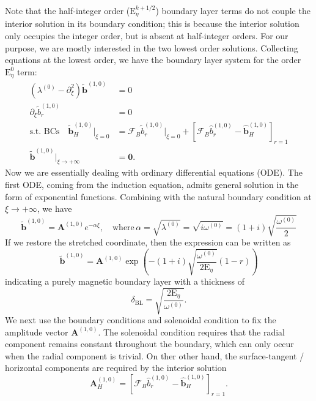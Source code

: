 %
Note that the half-integer order ($\mathrm{E}_\eta^{k+1/2}$) boundary layer terms do not couple the interior solution in its boundary condition; this is because the interior solution only occupies the integer order, but is absent at half-integer orders. For our purpose, we are mostly interested in the two lowest order solutions. Collecting equations at the lowest order, we have the boundary layer system for the order $\mathrm{E}_\eta^{0}$ term:
%
\begin{equation}
\begin{aligned}
    \left(\lambda^{(0)} - \partial_\xi^2 \right) \widetilde{\mathbf{b}}^{(1,0)} &= 0 \\ 
    \partial_\xi \widetilde{b}_r^{(1,0)} &= 0 \\ 
    \text{s.t. BCs} \quad \widetilde{\mathbf{b}}_H^{(1,0)}|_{\xi=0} &= \mathcal{F}_B \widetilde{b}_r^{(1,0)}|_{\xi=0} + \left[\mathcal{F}_B \widehat{b}_r^{(1,0)} - \widehat{\mathbf{b}}_H^{(1,0)}\right]_{r=1} \\ 
    \widetilde{\mathbf{b}}^{(1,0)}|_{\xi\rightarrow +\infty} &= \mathbf{0}.
\end{aligned}
\end{equation}
%
Now we are essentially dealing with ordinary differential equations (ODE). The first ODE, coming from the induction equation, admits general solution in the form of exponential functions. Combining with the natural boundary condition at $\xi\rightarrow +\infty$, we have
%
\begin{equation}
    \widetilde{\mathbf{b}}^{(1,0)} = \mathbf{A}^{(1,0)} e^{-\alpha\xi},\quad \text{where} \, \alpha = \sqrt{\lambda^{(0)}} = \sqrt{i\omega^{(0)}} = (1 + i) \sqrt{\frac{\omega^{(0)}}{2}}
\end{equation}
%
If we restore the stretched coordinate, then the expression can be written as 
%
\begin{equation}
    \widetilde{\mathbf{b}}^{(1,0)} = \mathbf{A}^{(1,0)} \exp\left(- (1 + i) \sqrt{\frac{\omega^{(0)}}{2\mathrm{E}_\eta}} (1-r)\right)
\end{equation}
%
indicating a purely magnetic boundary layer with a thickness of 
%
\begin{equation}
    \delta_{\mathrm{BL}} = \sqrt{\frac{2\mathrm{E}_\eta}{\omega^{(0)}}}.
\end{equation}
%
We next use the boundary conditions and solenoidal condition to fix the amplitude vector $\mathbf{A}^{(1,0)}$. The solenoidal condition requires that the radial component remains constant throughout the boundary, which can only occur when the radial component is trivial. On ther other hand, the surface-tangent / horizontal components are required by the interior solution
%
\begin{equation}
    \mathbf{A}_H^{(1,0)} = \left[\mathcal{F}_B \widehat{b}_r^{(1,0)} - \widehat{\mathbf{b}}_H^{(1,0)}\right]_{r=1}.
\end{equation}
%


